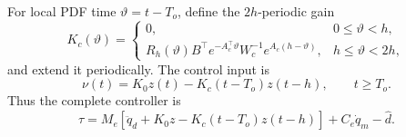 For local PDF time $\vartheta=t-T_o$, define the $2h$-periodic gain
\begin{equation}
 K_c(\vartheta)=\begin{cases}
 0,&0\leq\vartheta<h,\\
 R_h(\vartheta)B^\top e^{-A_c^\top\vartheta}W_c^{-1}
 e^{A_c(h-\vartheta)},&h\leq\vartheta<2h,
 \end{cases}
 \label{eq:kc_pdf}
\end{equation}
and extend it periodically. The control input is
\begin{equation}
 \nu(t)=K_0z(t)-K_c(t-T_o)z(t-h),\qquad t\geq T_o.
 \label{eq:pdf_error_input}
\end{equation}
Thus the complete controller is
\begin{equation}
 \tau=M_e\left[\ddot q_d+K_0z-K_c(t-T_o)z(t-h)\right]
 +C_e\dot q_m-\hat d.
 \label{eq:final_controller}
\end{equation}
